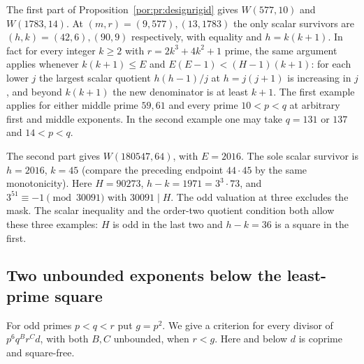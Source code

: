\documentclass[11pt,a4paper]{article}
\numberwithin{equation}{section}
\theoremstyle{remark}
\begin{document}
The first part of Proposition~\ref{por:pr:designrigid} gives $W(577,10)$ and $W(1783,14)$. At $(m,r)=(9,577),(13,1783)$ the only scalar survivors are $(h,k)=(42,6),(90,9)$ respectively, with equality and $h=k(k+1)$. In fact for every integer $k\ge2$ with $r=2k^3+4k^2+1$ prime, the same argument applies whenever $k(k+1)\le E$ and $E(E-1)<(H-1)(k+1)$: for each lower $j$ the largest scalar quotient $h(h-1)/j$ at $h=j(j+1)$ is increasing in $j$, and beyond $k(k+1)$ the new denominator is at least $k+1$. The first example applies for either middle prime $59,61$ and every prime $10<p<q$ at arbitrary first and middle exponents. In the second example one may take $q=131$ or $137$ and $14<p<q$.

The second part gives $W(180547,64)$, with $E=2016$. The sole scalar survivor is $h=2016$, $k=45$ (compare the preceding endpoint $44\cdot45$ by the same monotonicity). Here $H=90273$, $h-k=1971=3^3\cdot73$, and $3^{51}\equiv-1\pmod{30091}$ with $30091\mid H$. The odd valuation at three excludes the mask. The scalar inequality and the order-two quotient condition both allow these three examples: $H$ is odd in the last two and $h-k=36$ is a square in the first.

\subsection{Two unbounded exponents below the least-prime square}\label{found:J:2}
For odd primes $p<q<r$ put $g=p^2$. We give a criterion for every
divisor of $p^6q^Br^Cd$, with both $B,C$ unbounded, when $r<g$.
Here and below $d$ is coprime and square-free.
\end{document}
